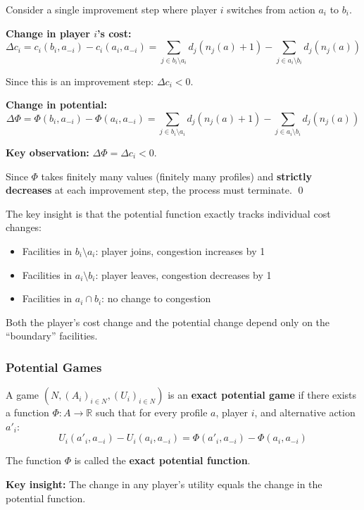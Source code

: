 \begin{thmbox}
Consider a single improvement step where player $i$ switches from action $a_i$ to $b_i$.

\textbf{Change in player $i$'s cost:}
\[
\Delta c_i = c_i(b_i, a_{-i}) - c_i(a_i, a_{-i}) = \sum_{j \in b_i \setminus a_i} d_j(n_j(a) + 1) - \sum_{j \in a_i \setminus b_i} d_j(n_j(a))
\]

Since this is an improvement step: $\Delta c_i < 0$.

\textbf{Change in potential:}
\[
\Delta \Phi = \Phi(b_i, a_{-i}) - \Phi(a_i, a_{-i}) = \sum_{j \in b_i \setminus a_i} d_j(n_j(a) + 1) - \sum_{j \in a_i \setminus b_i} d_j(n_j(a))
\]

\textbf{Key observation:} $\Delta \Phi = \Delta c_i < 0$.

Since $\Phi$ takes finitely many values (finitely many profiles) and \textbf{strictly decreases} at each improvement step, the process must terminate. \qed
\end{thmbox}

\begin{tipbox}
The key insight is that the potential function exactly tracks individual cost changes:
\begin{itemize}
  \item Facilities in $b_i \setminus a_i$: player joins, congestion increases by 1
  \item Facilities in $a_i \setminus b_i$: player leaves, congestion decreases by 1
  \item Facilities in $a_i \cap b_i$: no change to congestion
\end{itemize}
Both the player's cost change and the potential change depend only on the ``boundary'' facilities.
\end{tipbox}

\separator

\subsubsection{Potential Games}

\begin{defbox}
A game $(N, (A_i)_{i \in N}, (U_i)_{i \in N})$ is an \textbf{exact potential game} if there exists a function $\Phi : A \to \mathbb{R}$ such that for every profile $a$, player $i$, and alternative action $a'_i$:
\[
U_i(a'_i, a_{-i}) - U_i(a_i, a_{-i}) = \Phi(a'_i, a_{-i}) - \Phi(a_i, a_{-i})
\]

The function $\Phi$ is called the \textbf{exact potential function}.

\textbf{Key insight:} The change in any player's utility equals the change in the potential function.
\end{defbox}

